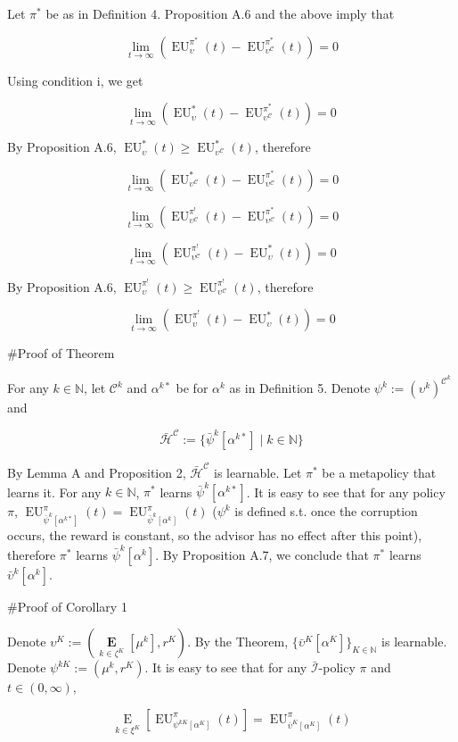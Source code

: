 \documentclass[a4paper]{article}
\newcommand{\E}[1]{\underset{#1}{\operatorname{E}}}
\newcommand{\Nats}{\mathbb{N}}
\newcommand{\I}{\mathcal{I}}
\newcommand{\Adi}{\bar{\I}}
\newcommand{\Hy}{\mathcal{H}}
\newcommand{\Co}{\mathcal{C}}
\newcommand{\EU}{\operatorname{EU}}
\newcommand{\BE}[1]{\underset{#1}{\boldsymbol{\operatorname{E}}}}
\begin{document}
Let $\pi^*$ be as in Definition 4. Proposition A.6 and the above imply that

$$\lim_{t \rightarrow \infty} (\EU_{\upsilon}^{\pi^*}(t)-\EU_{\upsilon^\Co}^{\pi^*}(t)) = 0$$

Using condition i, we get

$$\lim_{t \rightarrow \infty} (\EU_{\upsilon}^{*}(t)-\EU_{\upsilon^\Co}^{\pi^*}(t)) = 0$$

By Proposition A.6, $\EU_{\upsilon}^{*}(t) \geq \EU_{\upsilon^\Co}^{*}(t)$, therefore

$$\lim_{t \rightarrow \infty} (\EU_{\upsilon^\Co}^{*}(t)-\EU_{\upsilon^\Co}^{\pi^*}(t)) = 0$$

$$\lim_{t \rightarrow \infty} (\EU_{\upsilon^\Co}^{\pi^!}(t)-\EU_{\upsilon^\Co}^{\pi^*}(t)) = 0$$

$$\lim_{t \rightarrow \infty} (\EU_{\upsilon^\Co}^{\pi^!}(t)-\EU_{\upsilon}^{*}(t)) = 0$$

By Proposition A.6, $\EU_{\upsilon}^{\pi^!}(t) \geq \EU_{\upsilon^\Co}^{\pi^!}(t)$, therefore

$$\lim_{t \rightarrow \infty} (\EU_{\upsilon}^{\pi^!}(t)-\EU_{\upsilon}^{*}(t)) = 0$$

\#Proof of Theorem

For any $k \in \Nats$, let $\Co^k$ and $\alpha^{k*}$ be for $\alpha^k$ as in Definition 5. Denote $\psi^k:=(\upsilon^k)^{\Co^k}$ and 

$$\bar{\Hy}^\Co:=\{\bar{\psi}^k[\alpha^{k*}] \mid k \in \Nats \}$$

By Lemma A and Proposition 2, $\bar{\Hy}^\Co$ is learnable. Let $\pi^*$ be a metapolicy that learns it. For any $k \in \Nats$, $\pi^*$ learns $\bar{\psi}^k[\alpha^{k*}]$. It is easy to see that for any policy $\pi$, $\EU_{\bar{\psi}^k[\alpha^{k*}]}^\pi(t)=\EU_{\bar{\psi}^k[\alpha^{k}]}^\pi(t)$ ($\psi^k$ is defined s.t. once the corruption occurs, the reward is constant, so the advisor has no effect after this point), therefore $\pi^*$ learns $\bar{\psi}^k[\alpha^{k}]$. By Proposition A.7, we conclude that $\pi^*$ learns $\bar{\upsilon}^k[\alpha^k]$.

\#Proof of Corollary 1

Denote $\upsilon^K:=(\BE{k\in\zeta^K}[\mu^k],r^K)$. By the Theorem, $\{\bar{\upsilon}^K[\alpha^K]\}_{K \in \Nats}$ is learnable. Denote $\psi^{kK}:=(\mu^k,r^K)$. It is easy to see that for any $\Adi$-policy $\pi$ and $t\in(0,\infty)$,

$$\E{k \in \xi^K}[\EU_{\psi^{kK}[\alpha^K]}^\pi(t)] = \EU_{\bar{\upsilon}^K[\alpha^K]}^\pi(t)$$
\end{document}
